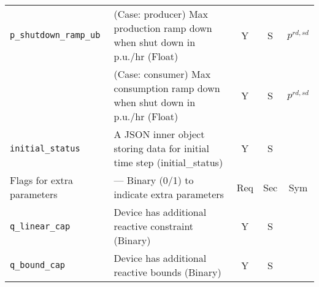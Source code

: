 \documentclass{article}
\begin{document}
\begin{center}
\begin{tabular}{ l | p{3.9in} | c | c | c |}
  {\tt p\_shutdown\_ramp\_ub}& {(Case: producer) Max production ramp down when shut down in p.u./hr (Float)} & Y & S & $p^{rd,sd}$\\
                             & {(Case: consumer) Max consumption ramp down when shut down in p.u./hr (Float)} & Y & S & $p^{rd,sd}$\\
  \hline
  {\tt initial\_status} & A JSON inner object storing data for initial time step (initial\_status) & Y & S &  \\
  \hline
  Flags for extra parameters & --- Binary (0/1) to indicate extra parameters & Req & Sec & Sym\\
   \hline
  {\tt q\_linear\_cap}      & Device has additional reactive constraint (Binary) & Y & S & \\
  {\tt q\_bound\_cap}       & Device has additional reactive bounds (Binary) & Y & S & \\
  \hline
\end{tabular}
\end{center}
\end{document}
